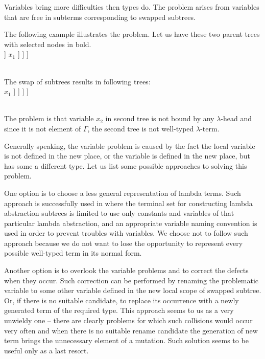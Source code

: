 \documentclass{sig-alternate}
\newcommand{\Lets}{Let us\xspace}
\newcommand{\lterm}{$\lambda$-term\xspace}
\newcommand{\lh}[1]{\lambda #1}
\begin{document}
Variables bring more difficulties then types do.
The problem arises from variables that are free in subterms corresponding to swapped subtrees. 

The following example illustrates the problem. \Lets have these two
parent trees with selected nodes in bold.\\

\Tree [.$\lh{x_1}$ [.f [.$\lh{x_2}$ [.\textbf{g} $x_2$ c ] ] $x_1$ ] ]
\Tree [.$\lh{x_1}$ [.h $x_1$ $\mathbf{x_1}$ ] ]

~\\The swap of subtrees results in following trees:\\

\Tree [.$\lh{x_1}$ [.f [.$\lh{x_2}$ $\mathbf{x_1}$ ] $x_1$ ] ]
\Tree [.$\lh{x_1}$ [.h $x_1$ [.\textbf{g} $\mathbf{x_2}$ \textbf{c} ] ] ]
 
~\\The problem is that variable $x_2$ in second tree
is not bound by any $\lambda$-head and since
it is not element of $\Gamma$, the second tree is not well-typed \lterm.  

Generally speaking, the variable problem is caused by the fact the local variable is not defined in the new place, or the variable is defined in the new place, but has
some a different type. Let us list some possible approaches to solving this problem.

One option is to choose a less general representation of lambda terms.
Such approach is successfully used in \cite{yu01} where the 
terminal set for constructing lambda abstraction subtrees 
is limited to use only constants and variables of that particular
lambda abstraction, and an appropriate variable naming convention is used in order to prevent troubles with variables.
We choose not to follow such approach because we do not want to
lose the opportunity to represent every possible well-typed 
term in its normal form.

Another option is to overlook the variable problems and to correct the
defects when they occur. Such correction can be performed by 
renaming the problematic variable to some other variable defined in the new local scope of swapped subtree. Or, if there is no suitable candidate, to replace its occurrence with a newly generated term of the required type. This approach seems to us as a very unwieldy one -- there are clearly problems for which such collisions would
occur very often and when there is no suitable rename candidate the 
generation of new term brings the unnecessary element of a mutation.
Such solution seems to be useful only as a last resort.
\end{document}
